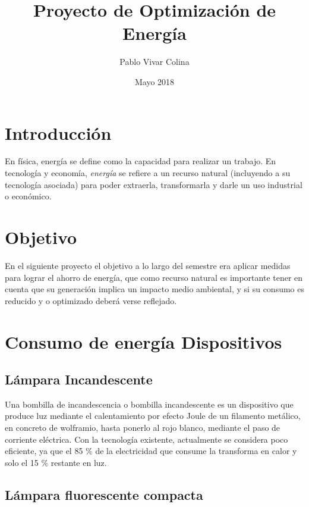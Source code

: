 \documentclass[]{article}
\title{Proyecto de Optimización de Energía}
\author{Pablo Vivar Colina}
\date{Mayo 2018}
\begin{document}
\maketitle

\section{Introducción}

En física, energía se define como la capacidad para realizar un trabajo. En tecnología y economía, \textit{energía} se refiere a un recurso natural (incluyendo a su tecnología asociada) para poder extraerla, transformarla y darle un uso industrial o económico.\cite{EnergiaWiki}\\


\section{Objetivo}

En el siguiente proyecto el objetivo a lo largo del semestre era aplicar medidas para lograr el ahorro de energía, que como recurso natural es importante tener en cuenta que su generación implica un impacto medio ambiental, y si su consumo es reducido y o optimizado deberá verse reflejado.\\

\section{Consumo de energía Dispositivos}


\subsection{Lámpara Incandescente}

Una bombilla de incandescencia o bombilla incandescente es un dispositivo que produce luz mediante el calentamiento por efecto Joule de un filamento metálico, en concreto de wolframio, hasta ponerlo al rojo blanco, mediante el paso de corriente eléctrica. Con la tecnología existente, actualmente se considera poco eficiente, ya que el 85 $\%$ de la electricidad que consume la transforma en calor y solo el 15 $\%$ restante en luz.\cite{LamparaIncandescente}

\subsection{Lámpara fluorescente compacta}
\end{document}
